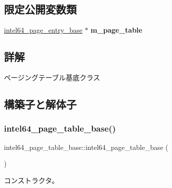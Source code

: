 \subsection*{限定公開変数類}
\begin{DoxyCompactItemize}
\item 
\hypertarget{classintel64__page__table__base_ac8b1275a4ac3ebf5f9d4cab59664307d}{}\label{classintel64__page__table__base_ac8b1275a4ac3ebf5f9d4cab59664307d} 
\hyperlink{classintel64__page__entry__base}{intel64\+\_\+page\+\_\+entry\+\_\+base} $\ast$ {\bfseries m\+\_\+page\+\_\+table}
\end{DoxyCompactItemize}


\subsection{詳解}
ページングテーブル基底クラス 

\subsection{構築子と解体子}
\hypertarget{classintel64__page__table__base_a882c0218105e469495b30aae2ddd03d7}{}\label{classintel64__page__table__base_a882c0218105e469495b30aae2ddd03d7} 
\subsubsection{\texorpdfstring{intel64\+\_\+page\+\_\+table\+\_\+base()}{intel64\_page\_table\_base()}\hspace{0.1cm}{\footnotesize\ttfamily [1/3]}}
{\footnotesize\ttfamily intel64\+\_\+page\+\_\+table\+\_\+base\+::intel64\+\_\+page\+\_\+table\+\_\+base (\begin{DoxyParamCaption}{ }\end{DoxyParamCaption})}

コンストラクタ。 \hypertarget{classintel64__page__table__base_a072ac5b2aedb98b992ecab44641ad8be}{}\label{classintel64__page__table__base_a072ac5b2aedb98b992ecab44641ad8be} 
